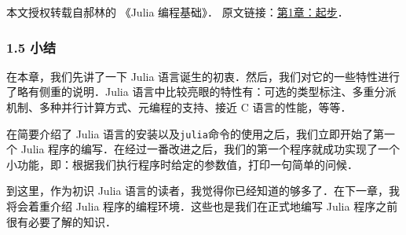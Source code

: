 
本文授权转载自郝林的 《Julia 编程基础》． 原文链接：\href{https://github.com/hyper0x/JuliaBasics/blob/master/book/ch01.md}{第1章：起步}．

\subsubsection{1.5 小结}

在本章，我们先讲了一下 Julia 语言诞生的初衷．然后，我们对它的一些特性进行了略有侧重的说明．Julia 语言中比较亮眼的特性有：可选的类型标注、多重分派机制、多种并行计算方式、元编程的支持、接近 C 语言的性能，等等．

在简要介绍了 Julia 语言的安装以及\verb|julia|命令的使用之后，我们立即开始了第一个 Julia 程序的编写．在经过一番改进之后，我们的第一个程序就成功实现了一个小功能，即：根据我们执行程序时给定的参数值，打印一句简单的问候．

到这里，作为初识 Julia 语言的读者，我觉得你已经知道的够多了．在下一章，我将会着重介绍 Julia 程序的编程环境．这些也是我们在正式地编写 Julia 程序之前很有必要了解的知识．